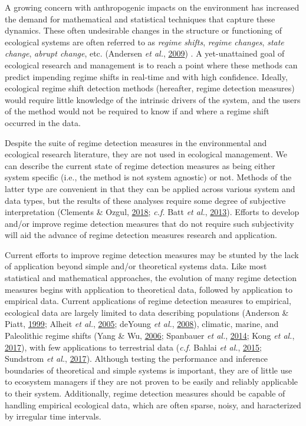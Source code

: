 \documentclass[12pt,twoside,openany]{reedthesis}
\begin{document}
A growing concern with anthropogenic impacts on the environment has increased the demand for mathematical and statistical techniques that capture these dynamics. These often undesirable changes in the structure or functioning of ecological systems are often referred to as \emph{regime shifts}, \emph{regime changes}, \emph{state change}, \emph{abrupt change}, etc. (Andersen \emph{et al.}, \protect\hyperlink{ref-andersen_ecological_2009}{2009}) . A yet-unattained goal of ecological research and management is to reach a point where these methods can predict impending regime shifts in real-time and with high confidence. Ideally, ecological regime shift detection methods (hereafter, regime detection measures) would require little knowledge of the intrinsic drivers of the system, and the users of the method would not be required to know if and where a regime shift occurred in the data.

Despite the suite of regime detection measures in the environmental and ecological research literature, they are not used in ecological management. We can describe the current state of regime detection measures as being either system specific (i.e., the method is not system agnostic) or not. Methods of the latter type are convenient in that they can be applied across various system and data types, but the results of these analyses require some degree of subjective interpretation (Clements \& Ozgul, \protect\hyperlink{ref-clements2018indicators}{2018}; \emph{c.f.} Batt \emph{et al.}, \protect\hyperlink{ref-batt2013changes}{2013}). Efforts to develop and/or improve regime detection measures that do not require such subjectivity will aid the advance of regime detection measures research and application.

Current efforts to improve regime detection measures may be stunted by the lack of application beyond simple and/or theoretical systems data. Like most statistical and mathematical approaches, the evolution of many regime detection measures begins with application to theoretical data, followed by application to empirical data. Current applications of regime detection measures to empirical, ecological data are largely limited to data describing populations (Anderson \& Piatt, \protect\hyperlink{ref-anderson_community_1999}{1999}; Alheit \emph{et al.}, \protect\hyperlink{ref-alheit_synchronous_2005}{2005}; deYoung \emph{et al.}, \protect\hyperlink{ref-deyoung_regime_2008}{2008}), climatic, marine, and Paleolithic regime shifts (Yang \& Wu, \protect\hyperlink{ref-yang_10_2006}{2006}; Spanbauer \emph{et al.}, \protect\hyperlink{ref-spanbauer_prolonged_2014}{2014}; Kong \emph{et al.}, \protect\hyperlink{ref-kong2017hydrological}{2017}), with few applications to terrestrial data (\emph{c.f.} Bahlai \emph{et al.}, \protect\hyperlink{ref-bahlai2015shifts}{2015}; Sundstrom \emph{et al.}, \protect\hyperlink{ref-sundstrom2017detecting}{2017}). Although testing the performance and inference boundaries of theoretical and simple systems is important, they are of little use to ecosystem managers if they are not proven to be easily and reliably applicable to their system. Additionally, regime detection measures should be capable of handling empirical ecological data, which are often sparse, noisy, and haracterized by irregular time intervals.
\end{document}
